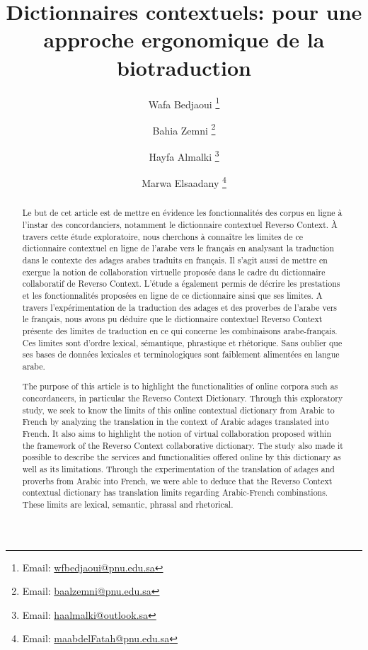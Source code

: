 \documentclass{textolivre}
\title{Dictionnaires contextuels: pour une approche ergonomique de la biotraduction}
\author[1]{Wafa Bedjaoui \orcid{0000-0002-0660-8418} \thanks{Email: \url{wfbedjaoui@pnu.edu.sa}}}
\author[1]{Bahia Zemni \orcid{orcid.org/0000-0002-6238-7509} \thanks{Email: \url{baalzemni@pnu.edu.sa}}}
\author[1]{Hayfa Almalki \thanks{Email: \url{haalmalki@outlook.sa}}}
\author[1]{Marwa Elsaadany \orcid{0000-0002-6867-4250} \thanks{Email: \url{maabdelFatah@pnu.edu.sa}}}
\affil[1]{Princess Nourah bint Abdulrahman University, Riyad/Arabie Saoudite.}
\begin{document}
\maketitle

\begin{polyabstract}
\begin{abstract}
Le but de cet article est de mettre en évidence les fonctionnalités des corpus en ligne à l'instar des concordanciers, 
notamment le dictionnaire contextuel Reverso Context. À travers cette étude exploratoire, nous cherchons à connaître les limites 
de ce dictionnaire contextuel en ligne de l'arabe vers le français en analysant la traduction dans le contexte des adages arabes 
traduits en français. Il s'agit aussi de mettre en exergue la notion de collaboration virtuelle proposée dans le cadre du 
dictionnaire collaboratif de Reverso Context. L'étude a également permis de décrire les prestations et les fonctionnalités 
proposées en ligne de ce dictionnaire ainsi que ses limites. A travers l'expérimentation de la traduction des adages et des 
proverbes de l'arabe vers le français, nous avons pu déduire que le dictionnaire contextuel Reverso Context présente des limites 
de traduction en ce qui concerne les combinaisons arabe-français. Ces limites sont d’ordre lexical, sémantique, phrastique et 
rhétorique. Sans oublier que ses bases de données lexicales et terminologiques sont faiblement alimentées en langue arabe.

\end{abstract}

\begin{english}
\begin{abstract}
The purpose of this article is to highlight the functionalities of online corpora such as concordancers, 
in particular the Reverso Context Dictionary. Through this exploratory study, we seek to know the limits 
of this online contextual dictionary from Arabic to French by analyzing the translation in the context of 
Arabic adages translated into French. It also aims to highlight the notion of virtual collaboration proposed 
within the framework of the Reverso Context collaborative dictionary. The study also made it possible to 
describe the services and functionalities offered online by this dictionary as well as its limitations. 
Through the experimentation of the translation of adages and proverbs from Arabic into French, we were able 
to deduce that the Reverso Context contextual dictionary has translation limits regarding Arabic-French 
combinations. These limits are lexical, semantic, phrasal and rhetorical.


\end{abstract}
\end{english}
\end{polyabstract}
\end{document}

